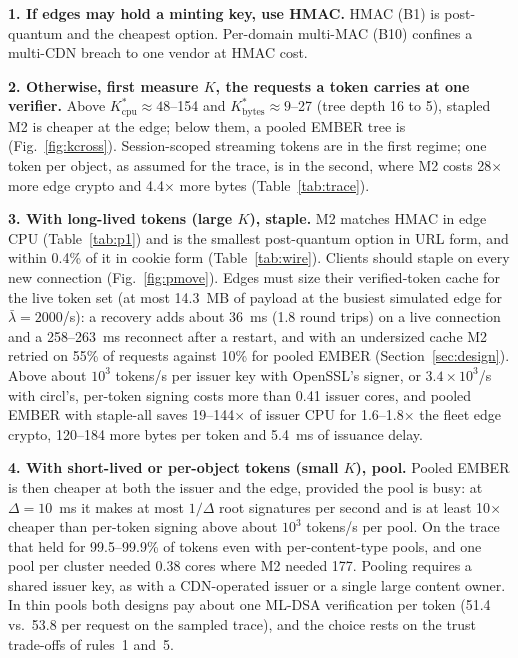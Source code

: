 \textbf{1. If edges may hold a minting key, use HMAC.} HMAC (B1) is post-quantum and the cheapest option. Per-domain multi-MAC (B10) confines a multi-CDN breach to one vendor at HMAC cost.

\textbf{2. Otherwise, first measure $K$, the requests a token carries at one verifier.} Above $K^*_{\text{cpu}}\approx48$--154 and $K^*_{\text{bytes}}\approx9$--27 (tree depth 16 to 5), stapled M2 is cheaper at the edge; below them, a pooled EMBER tree is (Fig.~\ref{fig:kcross}). Session-scoped streaming tokens are in the first regime; one token per object, as assumed for the trace, is in the second, where M2 costs 28$\times$ more edge crypto and 4.4$\times$ more bytes (Table~\ref{tab:trace}).

\textbf{3. With long-lived tokens (large $K$), staple.} M2 matches HMAC in edge CPU (Table~\ref{tab:p1}) and is the smallest post-quantum option in URL form, and within 0.4\% of it in cookie form (Table~\ref{tab:wire}). Clients should staple on every new connection (Fig.~\ref{fig:pmove}). Edges must size their verified-token cache for the live token set (at most 14.3~MB of payload at the busiest simulated edge for $\bar\lambda=2000$/s): a recovery adds about 36~ms (1.8 round trips) on a live connection and a 258--263~ms reconnect after a restart, and with an undersized cache M2 retried on 55\% of requests against 10\% for pooled EMBER (Section~\ref{sec:design}). Above about $10^3$ tokens/s per issuer key with OpenSSL's signer, or $3.4\times10^3$/s with circl's, per-token signing costs more than 0.41 issuer cores, and pooled EMBER with staple-all saves 19--144$\times$ of issuer CPU for 1.6--1.8$\times$ the fleet edge crypto, 120--184 more bytes per token and 5.4~ms of issuance delay.

\textbf{4. With short-lived or per-object tokens (small $K$), pool.} Pooled EMBER is then cheaper at both the issuer and the edge, provided the pool is busy: at $\Delta=10$~ms it makes at most $1/\Delta$ root signatures per second and is at least 10$\times$ cheaper than per-token signing above about $10^3$ tokens/s per pool. On the trace that held for 99.5--99.9\% of tokens even with per-content-type pools, and one pool per cluster needed 0.38 cores where M2 needed 177. Pooling requires a shared issuer key, as with a CDN-operated issuer or a single large content owner. In thin pools both designs pay about one ML-DSA verification per token (51.4 vs.\ 53.8\us{} per request on the sampled trace), and the choice rests on the trust trade-offs of rules~1 and~5.


